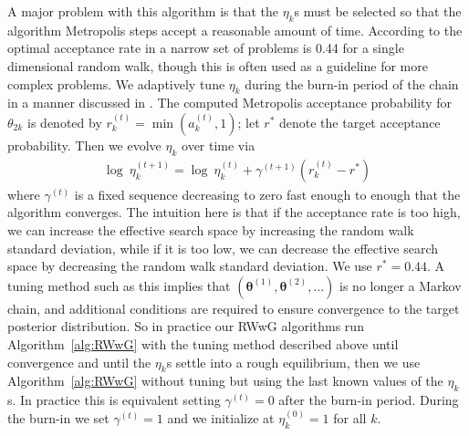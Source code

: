 \documentclass[12pt]{article}
\begin{document}
A major problem with this algorithm is that the $\eta_k$s must be selected so that the algorithm Metropolis steps accept a reasonable amount of time. According to \citet{gelman1996efficient} the optimal acceptance rate in a narrow set of problems is 0.44 for a single dimensional random walk, though this is often used as a guideline for more complex problems. We adaptively tune $\eta_k$ during the burn-in period of the chain in a manner discussed in \citet{andrieu2008tutorial}. The computed Metropolis acceptance probability for $\theta_{2k}$ is denoted by $r_{k}^{(t)} = \min(a_k^{(t)}, 1)$; let $r^*$ denote the target acceptance probability. Then we evolve $\eta_k$ over time via
\begin{align*}
\log\ \eta_{k}^{(t+1)} = \log\ \eta_{k}^{(t)} + \gamma^{(t+1)}(r_k^{(t)} - r^*)
\end{align*}
where $\gamma^{(t)}$ is a fixed sequence decreasing to zero fast enough to enough that the algorithm converges. The intuition here is that if the acceptance rate is too high, we can increase the effective search space by increasing the random walk standard deviation, while if it is too low, we can decrease the effective search space by decreasing the random walk standard deviation. We use $r^*=0.44$. A tuning method such as this implies that $(\bm{\theta}^{(1)}, \bm{\theta}^{(2)},\dots)$ is no longer a Markov chain, and additional conditions are required to ensure convergence to the target posterior distribution. So in practice our RWwG algorithms run Algorithm~\ref{alg:RWwG} with the tuning method described above until convergence and until the $\eta_k$s settle into a rough equilibrium, then we use Algorithm~\ref{alg:RWwG} without tuning but using the last known values of the $\eta_k$s. In practice this is equivalent setting $\gamma^{(t)}=0$ after the burn-in period. During the burn-in we set $\gamma^{(t)}=1$ and we initialize at $\eta_k^{(0)}=1$ for all $k$.
\end{document}

